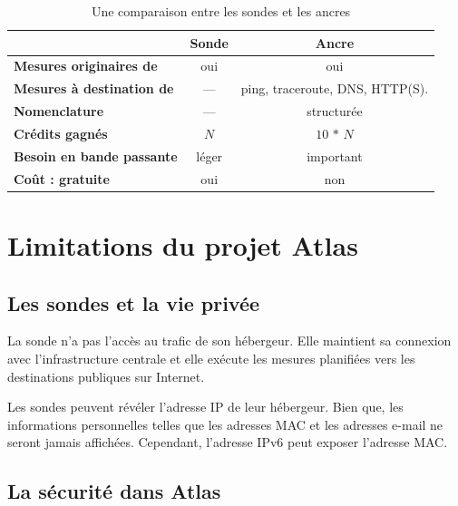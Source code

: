 \begin{table}[h]
	\centering
		\begin{tabular}{l c c}
			& \textbf{Sonde} & \textbf{Ancre}  \\ \hline
			\textbf{Mesures originaires de}	    &oui& oui \\ \hline
			\textbf{Mesures à destination de}	    & --- %
			& ping, traceroute, DNS, HTTP(S). \\ \hline
			\textbf{Nomenclature}                   & --- & structurée
			\\ \hline
			\textbf{Crédits  gagnés  }              & $N$ & $10$ $*$ $N$ \\ \hline
			
			\textbf{Besoin en bande passante }                  & léger & important \\ \hline
			\textbf{Coût : gratuite }                   & oui &  non 
			\\ \hline
	\end{tabular}
	\caption{Une comparaison entre les sondes et les ancres}
	\label{tab:comparaison-sonde-ancre}
\end{table}

\section{Limitations du projet Atlas}
\subsection{Les sondes  et la vie privée}
La sonde   n'a pas l'accès au trafic de son hébergeur. Elle maintient sa connexion avec l'infrastructure centrale et elle exécute les mesures planifiées vers les destinations publiques sur Internet. 

Les sondes   peuvent révéler l'adresse IP de leur hébergeur. Bien que, les informations personnelles telles que les adresses MAC et les adresses e-mail ne seront jamais affichées. Cependant, l'adresse IPv6 peut exposer l'adresse MAC. 

\subsection{La sécurité dans Atlas}

